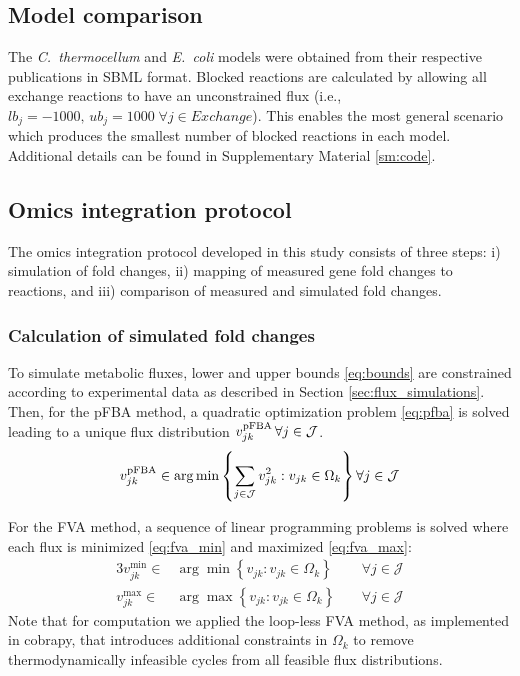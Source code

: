 \subsection{Model comparison}
The \textit{C.~thermocellum} and \textit{E.~coli} models were obtained from their respective publications in SBML format.
Blocked reactions are calculated by allowing all exchange reactions to have an unconstrained flux (i.e., $lb_j=-1000,\, ub_j=1000 \; \forall j \in \mathit{Exchange}$).
This enables the most general scenario which produces the smallest number of blocked reactions in each model. Additional details can be found in Supplementary Material \ref{sm:code}.

\subsection{Omics integration protocol}\label{sec:proteomics_method}
The omics integration protocol developed in this study consists of three steps: i) simulation of fold changes, ii) mapping of measured gene fold changes to reactions, and iii) comparison of measured and simulated fold changes.

\subsubsection{Calculation of simulated fold changes}
To simulate metabolic fluxes, lower and upper bounds \eqref{eq:bounds} are constrained according to experimental data as described in Section \ref{sec:flux_simulations}. Then, for the pFBA method, a quadratic optimization problem \eqref{eq:pfba} is solved leading to a unique flux distribution $v_{jk}^{\mathrm{pFBA}}\, \forall j \in \mathcal{J}$.
\begin{equation}
    v_{jk}^{\mathrm{pFBA}} \in \arg \min \left\{ \sum_{j \in \mathcal{J}} v_{jk}^2: v_{jk} \in \Omega_k \right\} \forall j \in \mathcal{J} \label{eq:pfba}
\end{equation}

For the FVA method, a sequence of linear programming problems is solved where each flux is minimized \eqref{eq:fva_min} and maximized \eqref{eq:fva_max}:
\begin{alignat}{3}
    v_{jk}^{\min} \in & \arg \min \left\{ v_{jk}: v_{jk} \in \Omega_k \right\} && \; \forall j \in \mathcal{J} \label{eq:fva_min}\\
    v_{jk}^{\max} \in & \arg \max \left\{ v_{jk}: v_{jk} \in \Omega_k \right\} && \; \forall j \in \mathcal{J} \label{eq:fva_max}
\end{alignat}
Note that for computation we applied the loop-less FVA method,\citep{schellenberger2011a, chan2018} as implemented in \mbox{cobrapy},\citep{ebrahim2013}  that introduces additional constraints in $\Omega_k$ to remove thermodynamically infeasible cycles from all feasible flux distributions.

